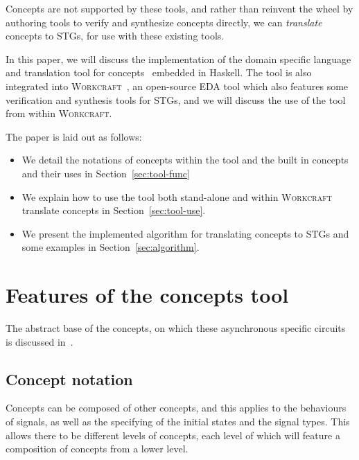 \documentclass[british,conference,compsoc]{IEEEtran}
\newcommand{\noun}[1]{\textsc{#1}}
\begin{document}
Concepts are not supported by these tools, and rather than reinvent the wheel by authoring tools
to verify and synthesize concepts directly, we can \emph{translate} concepts to STGs, for use with 
these existing tools.

In this paper, we will discuss the implementation of the domain specific language and translation tool
for concepts~\cite{2016_concepts_github} embedded in Haskell. The tool is also integrated into
\noun{Workcraft}~\cite{Workcraft_website}, an open-source EDA tool which also
features some verification and synthesis tools for STGs, and we will discuss the use of the tool 
from within \noun{Workcraft}.

The paper is laid out as follows:
\vspace{-6mm}
\begin{itemize}
  \item We detail the notations of concepts within the tool and the built in
  concepts and their uses in Section~\ref{sec:tool-func}
  \item We explain how to use the tool both stand-alone and within
  \noun{Workcraft} translate concepts in Section~\ref{sec:tool-use}.
  \item We present the implemented algorithm for translating concepts to STGs
  and some examples in Section~\ref{sec:algorithm}.
\end{itemize}


\section{Features of the concepts tool\label{sec:tool-func}}


The abstract base of the concepts, on which these asynchronous specific circuits
is discussed in~\cite{2015_Beaumont_MEMOCODE}.

\subsection{Concept notation \label{sub:concept-notation}}

Concepts can be composed of other concepts, and this applies to the behaviours of
signals, as well as the specifying of the initial states and the signal types. This allows
there to be different levels of concepts, each level of which will feature a composition
of concepts from a lower level. 
\end{document}
